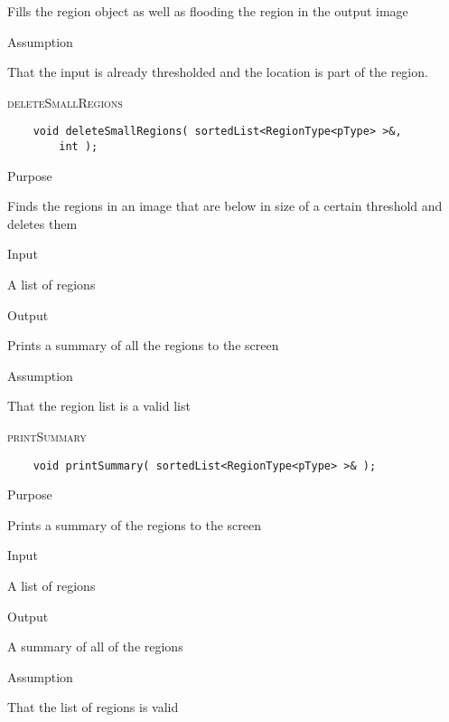 \documentclass[pdftex, 11pt]{article}
\begin{document}
\begin{description}
\begin{description}
				Fills the region object as well as flooding the region in the output image

			\item{Assumption}

				That the input is already thresholded and the location is part of the region.

		\end{description}

	\item{\textsc{deleteSmallRegions}}
\begin{lstlisting}
	void deleteSmallRegions( sortedList<RegionType<pType> >&,
		int );
\end{lstlisting}

		\begin{description}

			\item{Purpose}

				Finds the regions in an image that are below in size of a certain threshold and deletes them

			\item{Input}

				A list of regions 

			\item{Output}

				Prints a summary of all the regions to the screen

			\item{Assumption}

				That the region list is a valid list

		\end{description}

	\item{\textsc{printSummary}}
\begin{lstlisting}
	void printSummary( sortedList<RegionType<pType> >& );
\end{lstlisting}

		\begin{description}

			\item{Purpose}

				Prints a summary of the regions to the screen

			\item{Input}

				A list of regions

			\item{Output}

				A summary of all of the regions

			\item{Assumption}

				That the list of regions is valid

		\end{description}


\end{description}
\end{document}
